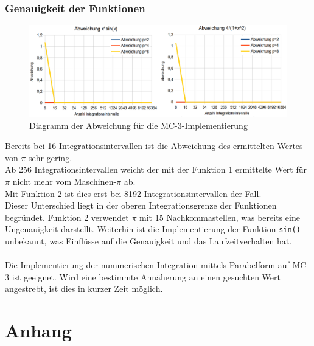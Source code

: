 \documentclass[a4paper,12pt]{scrartcl}
\begin{document}
\subsubsection{Genauigkeit der Funktionen}
\begin{figure}[htb]
  \begin{center}
    \includegraphics[width=1\hsize]{../mc3_abweichung.png}
  \end{center}
  \caption{\label{mc3genauigkeit}
    Diagramm der Abweichung f\"ur die MC-3-Implementierung}
\end{figure}
Bereits bei 16 Integrationsintervallen ist die Abweichung des ermittelten Wertes von $\pi$ sehr gering.\\
Ab 256 Integrationsintervallen weicht der mit der Funktion 1 ermittelte Wert f\"ur $\pi$ nicht mehr vom Maschinen-$\pi$ ab.\\
Mit Funktion 2 ist dies erst bei 8192 Integrationsintervallen der Fall.\\
Dieser Unterschied liegt in der oberen Integrationsgrenze der Funktionen begr\"undet. Funktion 2 verwendet $\pi$ mit 15 Nachkommastellen, was bereits eine
Ungenauigkeit darstellt. Weiterhin ist die Implementierung der Funktion \texttt{sin()} unbekannt, was Einfl\"usse auf die Genauigkeit und das Laufzeitverhalten hat.\\\\

Die Implementierung der nummerischen Integration mittels Parabelform auf MC-3 ist geeignet. Wird eine bestimmte Ann\"aherung an einen gesuchten Wert angestrebt,
ist dies in kurzer Zeit m\"oglich.

\clearpage
\section{Anhang}
\end{document}
